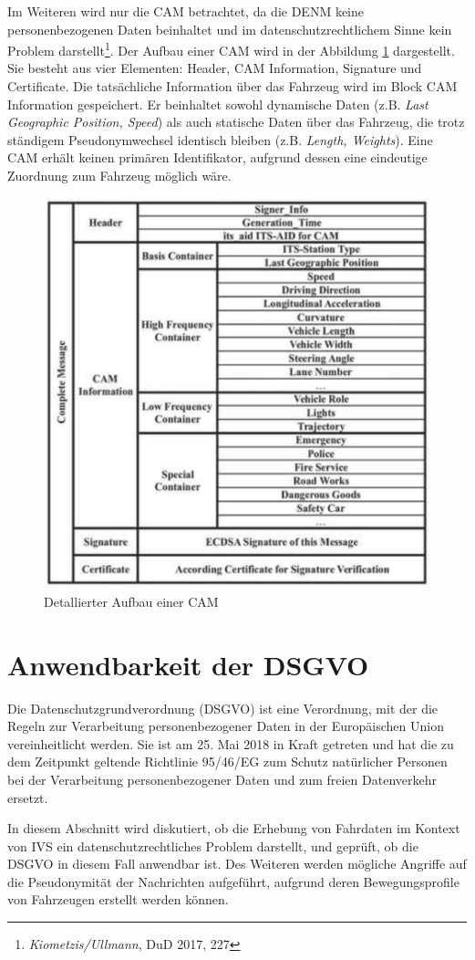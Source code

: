 Im Weiteren wird nur die CAM betrachtet, da die DENM keine personenbezogenen Daten beinhaltet und im datenschutzrechtlichem Sinne kein Problem darstellt\footnote{\emph{Kiometzis/Ullmann}, DuD 2017, 227}\nocite{Kiometzis2017}. Der Aufbau einer CAM wird in der Abbildung \ref{fig:cam} dargestellt. Sie besteht aus vier Elementen: Header, CAM Information, Signature und Certificate. Die tatsächliche Information über das Fahrzeug wird im Block CAM Information gespeichert. Er beinhaltet sowohl dynamische Daten (z.B. \textit{Last Geographic Position, Speed}) als auch statische Daten über das Fahrzeug, die trotz ständigem Pseudonymwechsel identisch bleiben (z.B. \textit{Length, Weights}). Eine CAM erhält keinen primären Identifikator, aufgrund dessen eine eindeutige Zuordnung zum Fahrzeug möglich wäre.

\begin{figure}
	\centering
	\includegraphics[width=0.4\linewidth]{images/CAM}
	\caption[Detallierter Aufbau einer CAM]{Detallierter Aufbau einer CAM \footnotemark}
	\label{fig:cam}
\end{figure}


\section{Anwendbarkeit der DSGVO}
\label{ch:SecondContentSection}

Die Datenschutzgrundverordnung (DSGVO) ist eine Verordnung, mit der die Regeln zur Verarbeitung personenbezogener Daten in der Europäischen Union vereinheitlicht werden. Sie ist am 25. Mai 2018 in Kraft getreten und hat die zu dem Zeitpunkt geltende Richtlinie 95/46/EG zum Schutz natürlicher Personen bei der Verarbeitung personenbezogener Daten und zum freien Datenverkehr ersetzt. 

In diesem Abschnitt wird diskutiert, ob die Erhebung von Fahrdaten im Kontext von IVS ein datenschutzrechtliches Problem darstellt, und geprüft, ob die DSGVO in diesem Fall anwendbar ist. Des Weiteren werden mögliche Angriffe auf die Pseudonymität der Nachrichten aufgeführt, aufgrund deren Bewegungsprofile von Fahrzeugen erstellt werden können. 

